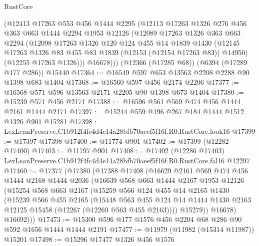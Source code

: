 \begin{lexlean}{RustCore}
\begin{coremodule}
      (@12413
        @17263
        @553
        @456
        @1444
        @2295
        (@12113
          @17263
          @1326
          @276
          @456
          @363
          @663
          @1444
          @2294
          @1953
          @12126
          (@12089
            @17263
            @1326
            @363
            @663
            @2294
            (@12098
              @17263
              @1326
              @120
              @124
              @455
              @14
              @1839
              @1430
              (@12145 @17263 @1326 @83 @455 @83 @1839 (@12153 (@12154 @17263 @83)) @14950)
              (@12255 @17263 @1326)))
          @16678)))
    (@12366 (@17285 @68))
    (@6394 (@17289 @177 @286))
    @15440
@17364 := @16549 @597 @653 @13563 @2208 @2288 @90 @1398 @683 @1404
@17368 := @16560 @597 @456 @2174 @2206
@17377 := @16568 @571 @596 @13563 @2171 @2205 @90 @1398 @673 @1404
@17380 := @15239 @571 @456 @2171
@17388 := @16596 @561 @569 @474 @456 @1444 @2161 @1444 @2171
@17397 := @15244 @559 @196 @267 @184 @1444 @1512 @1326 @901 @15281
@17398 := LexLeanPreserve.C1b912f4fc4d4e14a28bfb70aeef5f16f.R0.RustCore.look16
@17399 := @17397 @17398
@17400 := @11774 @901
@17402 := @17399 (@12282 @17400)
@17403 := @11797 @901
@17408 := @17402
    (@12286 @17403)
    LexLeanPreserve.C1b912f4fc4d4e14a28bfb70aeef5f16f.R0.RustCore.fal16
    @12297
@17460 := @17377
    (@17380
      (@17388
        @17408
        (@16629
          @2161
          @569
          @474
          @456
          @1444
          @2168
          @1444
          @2036
          (@16639
            @568
            @663
            @1444
            @2167
            @1953
            @12126
            (@15254
              @568
              @663
              @2167
              (@15259
                @566
                @124
                @455
                @14
                @2165
                @1430
                (@15239
                  @566
                  @455
                  @2165
                  (@15448
                    @563
                    @455
                    @124
                    @14
                    @1444
                    @1430
                    @2163
                    @12125
                    @15458
                    (@12267 (@12269 @563 @455 @2163))))
                @15279))
            @16678)
          @16692)))
@17473 := @15300 @596 @177 @1576 @456 @2204 @68 @286 @90 @592 @1656 @1444 @1444 @2191
@17477 := @11979 (@11982 (@15314 @11987)) @15201
@17498 := @15296
    @17477
    @1326
    @456
    @1576

\end{coremodule}
\end{lexlean}
